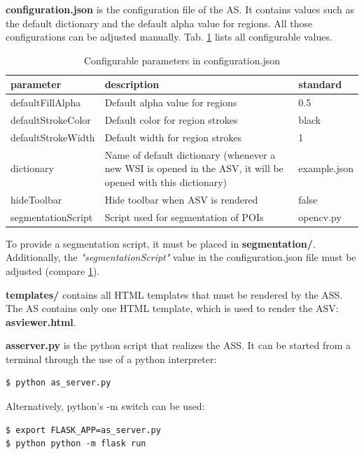 \textbf{configuration.json} is the configuration file of the AS. It contains values such as the default dictionary and the default alpha value for regions. All those configurations can be adjusted manually. Tab. \ref{tab4_assConfig} lists all configurable values.

\begin{table}[H]
	\begin{center}
		\begin{tabular}{| p{3cm} | p{5.5cm} | p{2cm} |}
			\hline
			\textbf{parameter} & \textbf{description} & \textbf{standard}\\ \hline
			defaultFillAlpha & Default alpha value for regions & 0.5\\ \hline
			defaultStrokeColor & Default color for region strokes & black \\ \hline
			defaultStrokeWidth & Default width for region strokes & 1 \\ \hline
			dictionary & Name of default dictionary (whenever a new WSI is opened in the ASV, it will be opened with this dictionary) & example.json\\ \hline
			hideToolbar & Hide toolbar when ASV is rendered & false\\ \hline
			segmentationScript & Script used for segmentation of POIs & opencv.py\\ \hline
		\end{tabular}
		\caption{Configurable parameters in configuration.json}
		\label{tab4_assConfig}
	\end{center}
\end{table}

To provide a segmentation script, it must be placed in \textbf{segmentation/}. Additionally, the \emph{"segmentationScript"} value in the configuration.json file must be adjusted (compare \ref{tab4_assConfig}).

\textbf{templates/} contains all HTML templates that must be rendered by the ASS. The AS contains only one HTML template, which is used to render the ASV: \textbf{as{\textunderscore}viewer.html}.

\textbf{as{\textunderscore}server.py} is the python script that realizes the ASS. It can be started from a terminal through the use of a python interpreter:
\begin{lstlisting}
$ python as_server.py
\end{lstlisting}

Alternatively, python's -m switch can be used:
\begin{lstlisting}
$ export FLASK_APP=as_server.py
$ python python -m flask run
\end{lstlisting}

